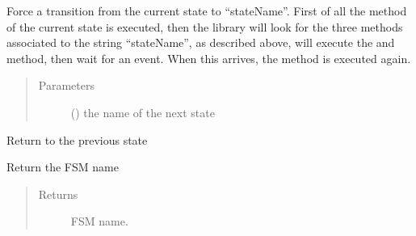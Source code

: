 \documentclass[letterpaper,10pt,english]{sphinxmanual}
\begin{document}

\begin{fulllineitems}
\label{\detokenize{fsm:gotoState}}
Force a transition from the current state to “stateName”. First of all the
 method of the current state is executed, then the library will
look for the three methods associated to the string “stateName”, as
described above, will execute the  and  method, then
wait for an event. When this arrives, the  method is executed again.
\begin{quote}\begin{description}
\item[{Parameters}] \leavevmode
{} () \textendash{} the name of the next state

\end{description}\end{quote}

\end{fulllineitems}


\begin{fulllineitems}
\label{\detokenize{fsm:gotoPrevState}}
Return to the previous state

\end{fulllineitems}


\begin{fulllineitems}
\label{\detokenize{fsm:fsmname}}
Return the FSM name
\begin{quote}\begin{description}
\item[{Returns}] \leavevmode
FSM name.

\end{description}\end{quote}

\end{fulllineitems}

\end{document}
